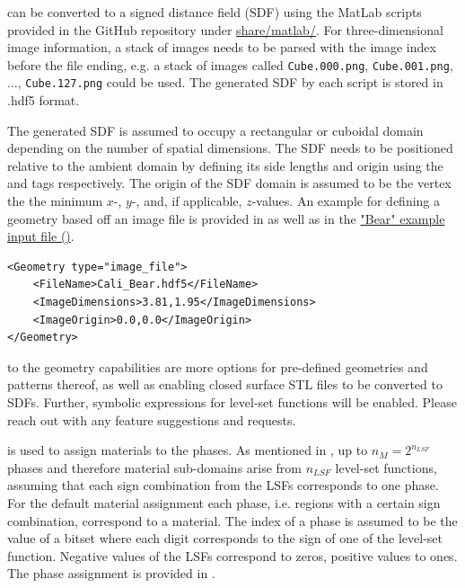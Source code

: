  can be converted to a signed distance field (SDF) using the MatLab scripts provided in the GitHub repository under \href{https://github.com/kkmaute/moris/tree/main/share/matlab}{share/matlab/}. For three-dimensional image information, a stack of images needs to be parsed with the image index before the file ending, e.g. a stack of images called \texttt{Cube.000.png}, \texttt{Cube.001.png}, ..., \texttt{Cube.127.png} could be used.
The generated SDF by each script is stored in .hdf5 format. 

The generated SDF is assumed to occupy a rectangular or cuboidal domain depending on the number of spatial dimensions. The SDF needs to be positioned relative to the ambient domain by defining its side lengths and origin using the  and  tags respectively. The origin of the SDF domain is assumed to be the vertex the the minimum $x$-, $y$-, and, if applicable, $z$-values. An example for defining a geometry based off an image file is provided in  as well as in the \href{https://github.com/kkmaute/moris/blob/main/share/doc/mesh_generation/examples/Bear_Example.xml}{"Bear" example input file (\ExternalLink)}.

\begin{minipage}{\linewidth}
\vspace{0.5cm}
\begin{lstlisting}[caption={Example parameters for an image file as provided in one of the examples.},captionpos=b, label={lst:image}]
<Geometry type="image_file"> 
    <FileName>Cali_Bear.hdf5</FileName>
    <ImageDimensions>3.81,1.95</ImageDimensions>
    <ImageOrigin>0.0,0.0</ImageOrigin>
</Geometry>
\end{lstlisting}
\end{minipage}

 to the geometry capabilities are more options for pre-defined geometries and patterns thereof, as well as enabling closed surface STL files to be converted to SDFs. Further, symbolic expressions for level-set functions will be enabled. Please reach out with any feature suggestions and requests.

 is used to assign materials to the phases. As mentioned in , up to $n_M = 2^{n_{LSF}}$ phases and therefore material sub-domains arise from $n_{LSF}$ level-set functions, assuming that each sign combination from the LSFs corresponds to one phase. For the default material assignment each phase, i.e. regions with a certain sign combination, correspond to a material. The index of a phase is assumed to be the value of a bitset where each digit corresponds to the sign of one of the level-set function. Negative values of the LSFs correspond to zeros, positive values to ones. The phase assignment is provided in .

